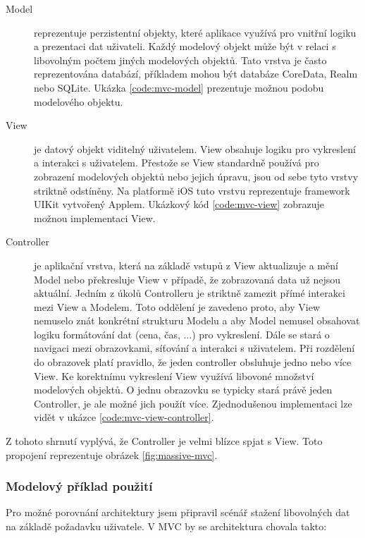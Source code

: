 \begin{description}
  \item[Model] reprezentuje perzistentní objekty, které aplikace využívá pro vnitřní logiku a prezentaci dat uživateli.
  Každý modelový objekt může být v relaci s libovolným počtem jiných modelových objektů.
  Tato vrstva je často reprezentována databází, příkladem mohou být databáze CoreData, Realm nebo SQLite.
  Ukázka \ref{code:mvc-model} prezentuje možnou podobu modelového objektu.

  \item[View] je datový objekt viditelný uživatelem. View obsahuje logiku pro vykreslení a interakci s uživatelem.
  Přestože se View standardně používá pro zobrazení modelových objektů nebo jejich úpravu, jsou od sebe tyto vrstvy striktně odstíněny.
  Na platformě iOS tuto vrstvu reprezentuje framework UIKit vytvořený Applem.
  Ukázkový kód \ref{code:mvc-view} zobrazuje možnou implementaci View.

  \item[Controller] je aplikační vrstva, která na základě vstupů z View aktualizuje a mění Model nebo překresluje View v případě, že zobrazovaná data už nejsou aktuální.
  Jedním z úkolů Controlleru je striktně zamezit přímé interakci mezi View a Modelem.
  Toto oddělení je zavedeno proto, aby View nemuselo znát konkrétní strukturu Modelu a aby Model nemusel obsahovat logiku formátování dat (cena, čas, ...) pro vykreslení.
  Dále se stará o navigaci mezi obrazovkami, síťování a interakci s uživatelem.
  Při rozdělení do obrazovek platí pravidlo, že jeden controller obsluhuje jedno nebo více View.
  Ke korektnímu vykreslení View využívá libovoné množství modelových objektů.
  O jednu obrazovku se typicky stará právě jeden Controller, je ale možné jich použít více.
  Zjednodušenou implementaci lze vidět v ukázce \ref{code:mvc-view-controller}.
\end{description}

Z tohoto shrnutí vyplývá, že Controller je velmi blízce spjat s View. Toto propojení reprezentuje obrázek \ref{fig:massive-mvc}.

\subsubsection{Modelový příklad použití}

Pro možné porovnání architektury jsem připravil scénář stažení libovolných dat na základě požadavku uživatele.
V MVC by se architektura chovala takto:

